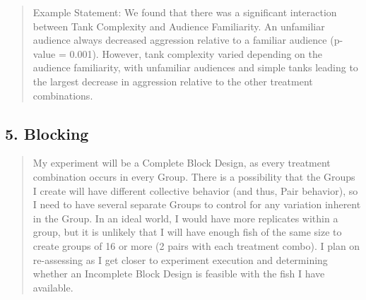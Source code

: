 \documentclass[
]{article}
\begin{document}
\begin{quote}
Example Statement: We found that there was a significant interaction
between Tank Complexity and Audience Familiarity. An unfamiliar audience
always decreased aggression relative to a familiar audience (p-value =
0.001). However, tank complexity varied depending on the audience
familiarity, with unfamiliar audiences and simple tanks leading to the
largest decrease in aggression relative to the other treatment
combinations.
\end{quote}

\hypertarget{blocking}{%
\subsection{5. Blocking}\label{blocking}}

\begin{quote}
My experiment will be a Complete Block Design, as every treatment
combination occurs in every Group. There is a possibility that the
Groups I create will have different collective behavior (and thus, Pair
behavior), so I need to have several separate Groups to control for any
variation inherent in the Group. In an ideal world, I would have more
replicates within a group, but it is unlikely that I will have enough
fish of the same size to create groups of 16 or more (2 pairs with each
treatment combo). I plan on re-assessing as I get closer to experiment
execution and determining whether an Incomplete Block Design is feasible
with the fish I have available.
\end{quote}
\end{document}
